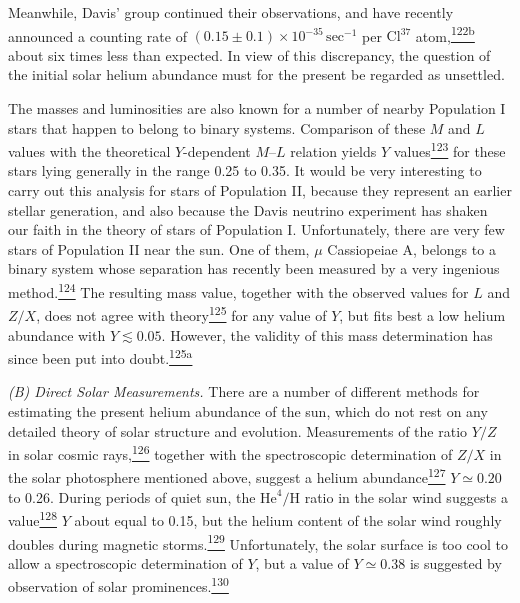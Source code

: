 Meanwhile, Davis' group continued their observations, and have recently
announced a counting rate of
\((0.15\pm0.1)\times10^{-35}\,\mathrm{sec}^{-1}\) per
\(\mathrm{Cl}^{37}\) atom,\hyperref[ch15-ref-122b]{\textsuperscript{122b}}
about six times less than expected. In view of this discrepancy, the question
of the initial solar helium abundance must for the present be regarded as
unsettled.

The masses and luminosities are also known for a number of nearby Population
I stars that happen to belong to binary systems. Comparison of these \(M\)
and \(L\) values with the theoretical \(Y\)-dependent \(M\)--\(L\) relation
yields \(Y\) values\hyperref[ch15-ref-123]{\textsuperscript{123}} for these
stars lying generally in the range 0.25 to 0.35. It would be very interesting
to carry out this analysis for stars of Population II, because they represent
an earlier stellar generation, and also because the Davis neutrino experiment
has shaken our faith in the theory of stars of Population I. Unfortunately,
there are very few stars of Population II near the sun. One of them,
\(\mu\) Cassiopeiae A, belongs to a binary system whose separation has
recently been measured by a very ingenious
method.\hyperref[ch15-ref-124]{\textsuperscript{124}} The resulting mass
value, together with the observed values for \(L\) and \(Z/X\), does not
agree with theory\hyperref[ch15-ref-125]{\textsuperscript{125}} for any
value of \(Y\), but fits best a low helium abundance with \(Y\lesssim0.05\).
However, the validity of this mass determination has since been put into
doubt.\hyperref[ch15-ref-125a]{\textsuperscript{125a}}

\emph{(B) Direct Solar Measurements.} There are a number of different
methods for estimating the present helium abundance of the sun, which do not
rest on any detailed theory of solar structure and evolution. Measurements
of the ratio \(Y/Z\) in solar cosmic
rays,\hyperref[ch15-ref-126]{\textsuperscript{126}} together with the
spectroscopic determination of \(Z/X\) in the solar photosphere mentioned
above, suggest a helium
abundance\hyperref[ch15-ref-127]{\textsuperscript{127}}
\(Y\simeq0.20\) to 0.26. During periods of quiet sun, the
\(\mathrm{He}^4/\mathrm H\) ratio in the solar wind suggests a
value\hyperref[ch15-ref-128]{\textsuperscript{128}} \(Y\) about equal to
0.15, but the helium content of the solar wind roughly doubles during
magnetic storms.\hyperref[ch15-ref-129]{\textsuperscript{129}}
Unfortunately, the solar surface is too cool to allow a spectroscopic
determination of \(Y\), but a value of \(Y\simeq0.38\) is suggested by
observation of solar prominences.\hyperref[ch15-ref-130]{\textsuperscript{130}}

